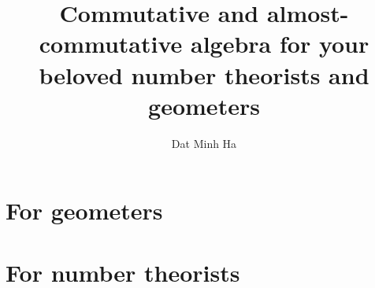 




    \frontmatter

	\title{Commutative and almost-commutative algebra for your beloved number theorists and geometers}
	
	\author{Dat Minh Ha}
	\maketitle
	
	{
      \hypersetup{} 
      \dominitoc
      \tableofcontents %
    }
	
	\newpage
	
	{
      \hypersetup{hidelinks} 
      \listoftodos
    }
    
    
	
	
	
	\mainmatter
	
	\part{For geometers}  
	    
	    
	    
	    
	    
	    
	    
	    
	    
	    
	    
	    
	    
	    
	    
	
	\part{For number theorists}
	    
	    
	    
	    
	    
	    
	    
	    
	    
	    
	    
	    
	    
	    
	    
	
